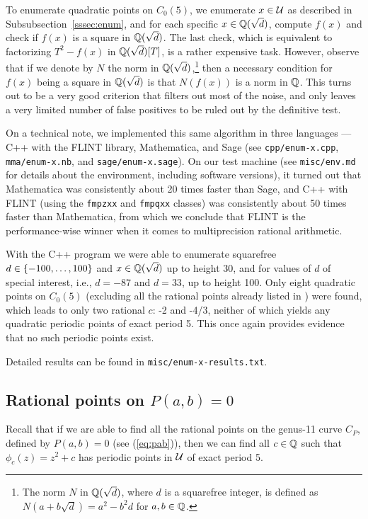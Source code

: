 To enumerate quadratic points on $C_0(5)$, we enumerate $x \in \mathcal{U}$ as
described in Subsubsection~\ref{sssec:enum}, and for each specific $x
\in \mathbb{Q}(\sqrt{d})$, compute $f(x)$ and check if $f(x)$ is a square in
$\mathbb{Q}(\sqrt{d})$. The last check, which is equivalent to factorizing
$T^2 - f(x)$ in $\mathbb{Q}(\sqrt{d})[T]$, is a rather expensive
task. However, observe that if we denote by $N$ the norm in
$\mathbb{Q}(\sqrt{d})$,\footnote{%
  The norm $N$ in $\mathbb{Q}(\sqrt{d})$, where $d$ is a squarefree integer,
  is defined as $N(a + b \sqrt{d}) = a^2 - b^2 d$ for $a, b \in \mathbb{Q}$.}
then a necessary condition for $f(x)$ being a square in $\mathbb{Q}(\sqrt{d})$
is that $N(f(x))$ is a norm in $\mathbb{Q}$. This turns out to be a very good
criterion that filters out most of the noise, and only leaves a very
limited number of false positives to be ruled out by the definitive
test.

On a technical note, we implemented this same algorithm in three
languages --- C++ with the FLINT library, Mathematica, and Sage (see
\texttt{cpp/enum-x.cpp}, \texttt{mma/enum-x.nb}, and
\texttt{sage/enum-x.sage}). On our test machine (see
\texttt{misc/env.md} for details about the environment, including
software versions), it turned out that Mathematica was consistently
about 20 times faster than Sage, and C++ with FLINT (using the
\texttt{fmpzxx} and \texttt{fmpqxx} classes) was consistently about 50
times faster than Mathematica, from which we conclude that FLINT is
the performance-wise winner when it comes to multiprecision rational
arithmetic.

With the C++ program we were able to enumerate squarefree $d \in
\left\{-100, \dots, 100\right\}$ and $x \in \mathbb{Q}(\sqrt{d})$ up to height 30, and
for values of $d$ of special interest, i.e., $d = -87$ and $d = 33$,
up to height 100. Only eight quadratic points on $C_0(5)$ (excluding
all the rational points already listed in \cite{MR1480542}) were
found, which leads to only two rational $c$: -2 and -4/3, neither of
which yields any quadratic periodic points of exact period 5. This
once again provides evidence that no such periodic points exist.

Detailed results can be found in \texttt{misc/enum-x-results.txt}.

\subsection{Rational points on $P(a, b) = 0$}
\label{subsec:pab-ratpoint}

Recall that if we are able to find all the rational points on the
genus-11 curve $C_P$, defined by $P(a, b) = 0$ (see (\ref{eq:pab})),
then we can find all $c \in \mathbb{Q}$ such that $\phi_c(z) = z^2 + c$ has
periodic points in $\mathcal{U}$ of exact period 5.

